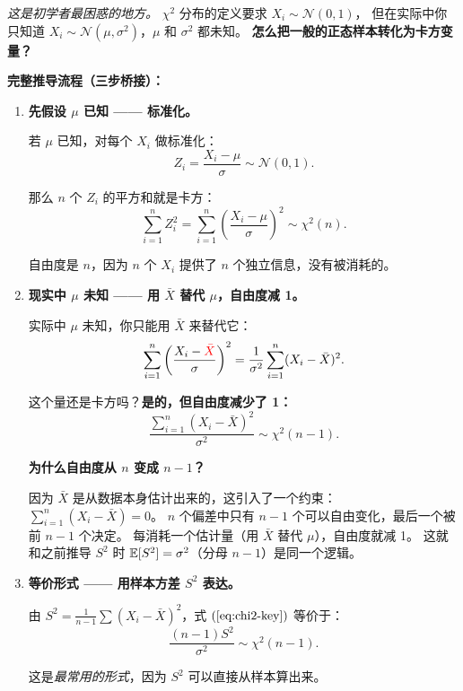 \emph{这是初学者最困惑的地方。} $\chi^2$ 分布的定义要求 $X_i \sim \mathcal{N}(0,1)$，
但在实际中你只知道 $X_i \sim \mathcal{N}(\mu, \sigma^2)$，$\mu$ 和 $\sigma^2$ 都未知。
\textbf{怎么把一般的正态样本转化为卡方变量？}

\medskip
\textbf{完整推导流程（三步桥接）：}

\begin{enumerate}[label=\textbf{第 \arabic* 步}, leftmargin=*]

    \item \textbf{先假设 $\mu$ 已知 —— 标准化。}

    若 $\mu$ 已知，对每个 $X_i$ 做标准化：
    \begin{equation}
        Z_i = \frac{X_i - \mu}{\sigma} \sim \mathcal{N}(0,1).
    \end{equation}

    那么 $n$ 个 $Z_i$ 的平方和就是卡方：
    \begin{equation}
        \sum_{i=1}^{n} Z_i^2 = \sum_{i=1}^{n} \left(\frac{X_i - \mu}{\sigma}\right)^2 \sim \chi^2(n).
        \label{eq:chi2-if-mu-known}
    \end{equation}

    自由度是 $n$，因为 $n$ 个 $X_i$ 提供了 $n$ 个独立信息，没有被消耗的。

    \item \textbf{现实中 $\mu$ 未知 —— 用 $\bar{X}$ 替代 $\mu$，自由度减 1。}

    实际中 $\mu$ 未知，你只能用 $\bar{X}$ 来替代它：
    \begin{equation}
        \sum_{i=1}^{n} \left(\frac{X_i - \textcolor{red}{\bar{X}}}{\sigma}\right)^2
        = \frac{1}{\sigma^2} \sum_{i=1}^{n} (X_i - \bar{X})^2.
    \end{equation}

    这个量还是卡方吗？\textbf{是的，但自由度减少了 1：}
    \begin{equation}
        \boxed{\frac{\sum_{i=1}^{n} (X_i - \bar{X})^2}{\sigma^2} \sim \chi^2(n-1)}.
        \label{eq:chi2-key}
    \end{equation}

    \textbf{为什么自由度从 $n$ 变成 $n-1$？}

    因为 $\bar{X}$ 是从数据本身估计出来的，这引入了一个约束：
    $\sum_{i=1}^{n} (X_i - \bar{X}) = 0$。
    $n$ 个偏差中只有 $n-1$ 个可以自由变化，最后一个被前 $n-1$ 个决定。
    每消耗一个估计量（用 $\bar{X}$ 替代 $\mu$），自由度就减 1。
    这就和之前推导 $S^2$ 时 $\mathbb{E}[S^2] = \sigma^2$（分母 $n-1$）是同一个逻辑。

    \item \textbf{等价形式 —— 用样本方差 $S^2$ 表达。}

    由 $S^2 = \frac{1}{n-1}\sum (X_i - \bar{X})^2$，式 $(\ref{eq:chi2-key})$ 等价于：
    \begin{equation}
        \boxed{\frac{(n-1)S^2}{\sigma^2} \sim \chi^2(n-1)}.
        \label{eq:chi2-sample-var}
    \end{equation}

    这是\emph{最常用的形式}，因为 $S^2$ 可以直接从样本算出来。
\end{enumerate}

